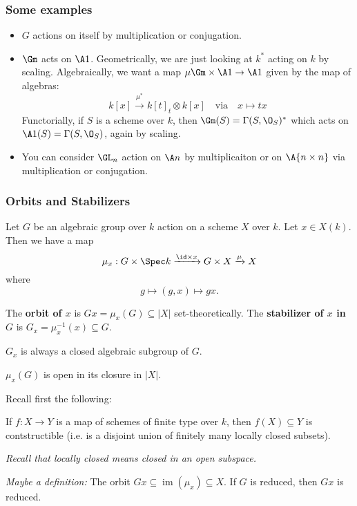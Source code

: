 \documentclass[12pt]{article}
\begin{document}
\subsubsection{Some examples}
\begin{itemize}
	\item $G$ actions on itself by multiplication or conjugation.
	\item $\Gm$ acts on $\A1$. Geometrically, we are just looking at $k^\ast$ acting on $k$ by scaling.
	Algebraically, we want a map $\mu\Gm\times\A1\to\A1$ given by the map of algebras:
	\[k[x]\xrightarrow{\mu^\ast}k[t]_t\otimes k[x]\quad\text{via}\quad x\mapsto tx\]
	Functorially, if $S$ is a scheme over $k$, then $\Gm(S)=\Gamma(S,\O_S)^\ast$ which acts on $\A1(S)=\Gamma(S,\O_S)$,
	again by scaling.
	\item You can consider $\GL_n$ action on $\A n$ by multiplicaiton or on $\A{n\times n}$ via multiplication or conjugation.
\end{itemize}
\subsubsection{Orbits and Stabilizers}
Let $G$ be an algebraic group over $k$ action on a scheme $X$ over $k$. Let $x\in X(k)$. Then we have a map
\[\mu_x:G\times \Spec k\xrightarrow{\id\times x}G\times X\xrightarrow{\mu}X\]
where 
\[g\mapsto (g,x)\mapsto gx.\]
\begin{defn}
	The \textbf{orbit of $x$} is $Gx=\mu_x(G)\subseteq |X|$ set-theoretically. The \textbf{stabilizer of $x$ in $G$} 
	is $G_x=\mu_x^{-1}(x)\subseteq G$. 
\end{defn}
\begin{rmk}
	$G_x$ is always a closed algebraic subgroup of $G$.
\end{rmk}
\begin{prop}
	$\mu_x(G)$ is open in its closure in $|X|$.
\end{prop}
Recall first the following:
\begin{thm}
	If $f:X\to Y$ is a map of schemes of finite type over $k$, then $f(X)\subseteq Y$ is contstructible (i.e. 
	is a disjoint union of finitely many locally closed subsets).

	\noindent\textit{Recall that locally closed means closed in an open subspace.}
\end{thm}
\begin{cor}
	\textit{Maybe a definition:} The orbit $Gx\subseteq \operatorname{im}(\mu_x)\subseteq X$. If 
	$G$ is reduced, then $Gx$ is reduced.
\end{cor}
\end{document}
